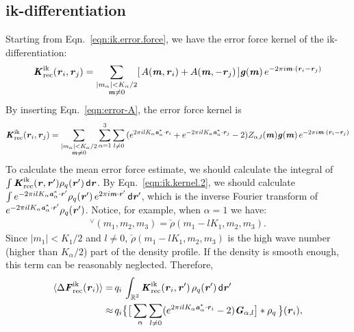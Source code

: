 \documentclass[aps,pre,preprint]{revtex4}
\renewcommand{\v}[1]{\textbf{\textit{#1}}}
\renewcommand{\d}[1]{\textsf{#1}}
\begin{document}
\subsection{ik-differentiation}
Starting from Eqn.~\eqref{eqn:ik.error.force}, we have the error force kernel
of the ik-differentiation:
\begin{align}
  \v K^{\textrm{ik}}_{\textrm{rec}}(\v r_i, \v r_j)
  =
  \sum_{
    \begin{subarray}{c}
      \vert m_{\alpha}\vert < K_\alpha/2\\
      \v m\neq 0
    \end{subarray}}
  [\,A(\v m, \v r_i) + A(\v m,-\v r_j)\,]
  \v g(\v m)\,e^{-2\pi i\v m\cdot(\v r_i-\v r_j)}
\end{align}
By inserting Eqn.~\eqref{eqn:error-A}, the error force kernel is
\begin{align}
  \label{eqn:ik.kernel.2}
  \v K^{\textrm{ik}}_{\textrm{rec}}(\v r_i, \v r_j)
  =
  \sum_{
    \begin{subarray}{c}
      \vert m_{\alpha}\vert < K_\alpha/2\\
      \v m\neq 0
    \end{subarray}}
  \sum_{\alpha=1}^3\sum_{l\neq 0}
  \,(
  e^{2\pi i l K_\alpha\v a^\ast_\alpha\cdot \v r_i} +
  e^{-2\pi i l K_\alpha\v a^\ast_\alpha\cdot \v r_j}
  - 2
  )
  Z_{\alpha,l}(\v m)
  \v g(\v m)\,e^{-2\pi i\v m\cdot(\v r_i-\v r_j)}
\end{align}
To calculate the mean error force estimate, we should
calculate the integral of
$\int \v K^{\textrm{ik}}_{\textrm{rec}}(\v r, \v r')\rho_q(\v r')\,\d d\v r$.
By Eqn.~\eqref{eqn:ik.kernel.2}, we should calculate
$  \int e^{-2\pi i l K_\alpha\v a^\ast_\alpha\cdot \v r'}\rho_q(\v r')
\,e^{2\pi i\v m\cdot\v r'}\,\d d\v r'$, which is the inverse Fourier transform
of $e^{-2\pi i l K_\alpha\v a^\ast_\alpha\cdot \v r'}\rho_q(\v r')$. Notice,
for example, when $\alpha=1$ we have:
\begin{align}
  [\,\rho_q(\v r')\,e^{-2\pi i l K_1\v a^\ast_1\cdot \v r'}\,] ^\vee
  (m_1, m_2, m_3)
  = \check\rho(m_1-lK_1, m_2, m_3).
\end{align}
Since $\vert m_1\vert < K_1/2$ and $l\neq 0$,
$\check\rho(m_1-lK_1, m_2, m_3)$ is
the high wave number (higher than $K_\alpha / 2$) part of the density profile.
If the density is smooth enough, this term can be reasonably neglected.
Therefore,
\begin{align}\nonumber
  \langle\Delta\v F^{\textrm{ik}}_{\textrm{rec}}(\v r_i)\rangle
  =\,&
  q_i\, \int_{\mathbb R^3}
  \v K^{\textrm{ik}}_{\textrm{rec}} (\v r_i,\v r')\,\rho_q(\v r')\,\d d\v r'\\
  \approx\,&
  q_i
  \big\{
  \big[
  \sum_{\alpha}\sum_{l\neq 0}
  (e^{2\pi i l K_\alpha\v a^\ast_\alpha\cdot \v r_i}   - 2 )
  \v G_{\alpha,l}
  \big]
  \ast\rho_q\,
  \big\} (\v r_i),
\end{align}
\end{document}
